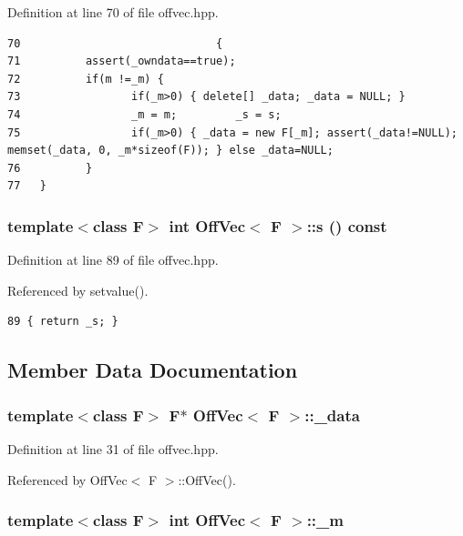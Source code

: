 Definition at line 70 of file offvec.hpp.

\footnotesize\begin{verbatim}70                              {
71          assert(_owndata==true);
72          if(m !=_m) {
73                 if(_m>0) { delete[] _data; _data = NULL; }
74                 _m = m;         _s = s;
75                 if(_m>0) { _data = new F[_m]; assert(_data!=NULL);  memset(_data, 0, _m*sizeof(F)); } else _data=NULL;
76          }
77   }
\end{verbatim}\normalsize 


\subsubsection{\setlength{\rightskip}{0pt plus 5cm}template$<$class F$>$ int {\bf Off\-Vec}$<$ F $>$::s () const\hspace{0.3cm}{\tt  [inline]}}\label{classOffVec_718f9fe30c4c5a49a2c162d5d70c314b_718f9fe30c4c5a49a2c162d5d70c314b}




Definition at line 89 of file offvec.hpp.

Referenced by setvalue().

\footnotesize\begin{verbatim}89 { return _s; }
\end{verbatim}\normalsize 




\subsection{Member Data Documentation}
\subsubsection{\setlength{\rightskip}{0pt plus 5cm}template$<$class F$>$ F$\ast$ {\bf Off\-Vec}$<$ F $>$::{\bf \_\-data}}\label{classOffVec_7125153abbcb2e949a1b4f81cbe22af5_7125153abbcb2e949a1b4f81cbe22af5}




Definition at line 31 of file offvec.hpp.

Referenced by Off\-Vec$<$ F $>$::Off\-Vec().
\subsubsection{\setlength{\rightskip}{0pt plus 5cm}template$<$class F$>$ int {\bf Off\-Vec}$<$ F $>$::{\bf \_\-m}}\label{classOffVec_b781ae81625400d76d94420d3af2c230_b781ae81625400d76d94420d3af2c230}




